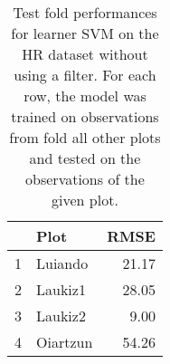 \begin{table}[ht!]
\centering
\caption{Test fold performances for learner SVM on the HR dataset without using a filter. For each row, the model was trained on observations from fold all other plots and tested on the observations of the given plot.} 
\label{tab:svm-single-fold-perf}
\begin{tabular}{rlr}
  \hline
 & Plot & RMSE \\ 
  \hline
1 & Luiando & 21.17 \\ 
  2 & Laukiz1 & 28.05 \\ 
  3 & Laukiz2 & 9.00 \\ 
  4 & Oiartzun & 54.26 \\ 
   \hline
\end{tabular}
\end{table}
